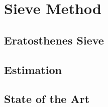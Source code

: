 
\section{Sieve Method}

\subsection{Eratosthenes Sieve}
% 



\subsection{Estimation}




\subsection{State of the Art}


